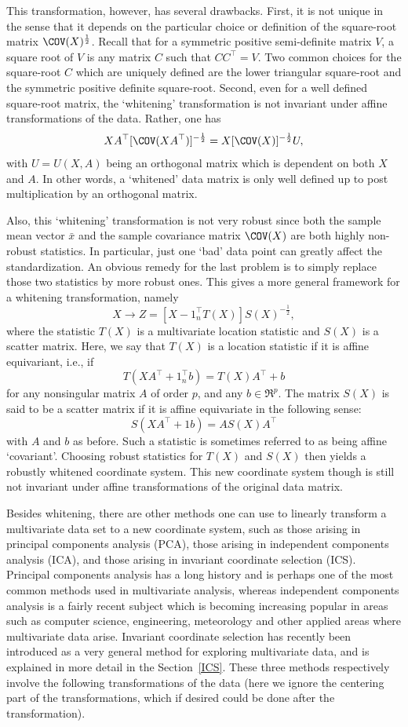 \documentclass[article,nojss]{jss}
\begin{document}
This transformation, however, has several drawbacks. First, it is
not unique in the sense that it depends on the particular choice or
definition of the square-root matrix $\COV(X)^{\frac{1}{2}}$. Recall
that for a symmetric positive semi-definite matrix $V$, a square
root of $V$ is any matrix $C$ such that $CC^\top  = V$. Two common
choices for the square-root $C$ which are uniquely defined are the
lower triangular square-root and the symmetric positive definite
square-root. Second, even for a well defined square-root matrix, the
`whitening' transformation is not invariant under affine
transformations of the data. Rather, one has
\[
 XA^\top [\COV(XA^\top )]^{-\frac{1}{2}} = X[\COV(X)]^{-\frac{1}{2}}U,
\]
with $U=U(X,A)$ being an orthogonal matrix which is dependent on both $X$ and $A$. In other words, a `whitened' data matrix is only well defined
up to post multiplication by an orthogonal matrix.

Also, this `whitening' transformation is not very robust since both
the sample mean vector $\bar{x}$ and the sample covariance matrix
$\COV(X)$ are both highly non-robust statistics. In particular, just
one `bad' data point can greatly affect the standardization.  An
obvious remedy for the last problem is to simply replace those two
statistics by more robust ones. This gives a more general framework
for a whitening transformation, namely
\[
X \rightarrow Z=[X-1_n^\top T(X)]S(X)^{-\frac{1}{2}},
\]
where the statistic $T(X)$ is a multivariate location statistic and $S(X)$ is a scatter matrix.  Here, we say that
$T(X)$ is a location statistic if it is affine equivariant,
i.e., if
\[
T(XA^\top +1_n^\top  b)=T(X)A^\top +b
\]
for any nonsingular matrix $A$ of order $p$, and any $b \in \Re^p$. The matrix $S(X)$ is said to be a scatter matrix if it
is  affine equivariate in the following sense:
\[
S(XA^\top +1b)=AS(X)A^\top 
\]
with $A$ and $b$ as before. Such a statistic is sometimes referred to as being affine `covariant'. Choosing robust statistics
for $T(X)$ and $S(X)$ then yields a robustly whitened coordinate system. This new coordinate system though is still not invariant
under affine transformations of the original data matrix.

Besides whitening, there are other methods one can use to linearly transform a multivariate data set to a new coordinate system,
such as those arising in principal components analysis ({PCA}), those arising in independent components analysis ({ICA}),
and those arising in invariant coordinate selection ({ICS}). Principal components analysis has a long history and is perhaps
one of the most common methods used in multivariate analysis, whereas independent components analysis is a fairly recent subject
which is becoming increasing popular in areas such as computer science, engineering, meteorology and other applied areas where
multivariate data arise. Invariant coordinate selection has recently been introduced as a very general method for exploring
multivariate data, and is explained in more detail in the Section~\ref{ICS}. These three methods respectively involve the following transformations
of the data (here we ignore the centering part of the transformations, which if desired could be done after the transformation).
\end{document}
